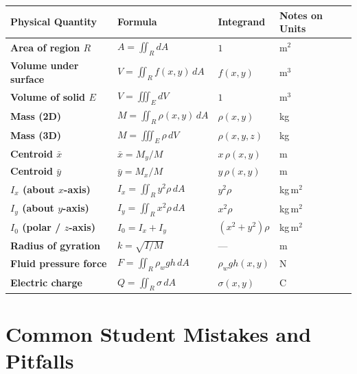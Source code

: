 \documentclass[12pt,a4paper]{article}
\begin{document}
\begin{center}
\small
\begin{tabular}{>{\bfseries}p{3.5cm} p{4.5cm} p{2.5cm} p{3cm}}
\toprule
Physical Quantity & Formula & Integrand & Notes on Units \\
\midrule
Area of region \(R\) &
\(A = \iint_R dA\) & \(1\) & m\(^2\) \\[4pt]
Volume under surface &
\(V = \iint_R f(x,y)\,dA\) & \(f(x,y)\) & m\(^3\) \\[4pt]
Volume of solid \(E\) &
\(V = \iiint_E dV\) & \(1\) & m\(^3\) \\[4pt]
Mass (2D) &
\(M = \iint_R \rho(x,y)\,dA\) & \(\rho(x,y)\) & kg \\[4pt]
Mass (3D) &
\(M = \iiint_E \rho\,dV\) & \(\rho(x,y,z)\) & kg \\[4pt]
Centroid \(\bar{x}\) &
\(\bar{x} = M_y/M\) &
\(x\,\rho(x,y)\) & m \\[4pt]
Centroid \(\bar{y}\) &
\(\bar{y} = M_x/M\) &
\(y\,\rho(x,y)\) & m \\[4pt]
\(I_x\) (about \(x\)-axis) &
\(I_x = \iint_R y^2\rho\,dA\) & \(y^2\rho\) & kg\,m\(^2\) \\[4pt]
\(I_y\) (about \(y\)-axis) &
\(I_y = \iint_R x^2\rho\,dA\) & \(x^2\rho\) & kg\,m\(^2\) \\[4pt]
\(I_0\) (polar / \(z\)-axis) &
\(I_0 = I_x + I_y\) & \((x^2+y^2)\rho\) & kg\,m\(^2\) \\[4pt]
Radius of gyration &
\(k = \sqrt{I/M}\) & --- & m \\[4pt]
Fluid pressure force &
\(F = \iint_R \rho_w g h\,dA\) & \(\rho_w g h(x,y)\) & N \\[4pt]
Electric charge &
\(Q = \iint_R \sigma\,dA\) & \(\sigma(x,y)\) & C \\
\bottomrule
\end{tabular}
\end{center}

\section{Common Student Mistakes and Pitfalls}
\end{document}

